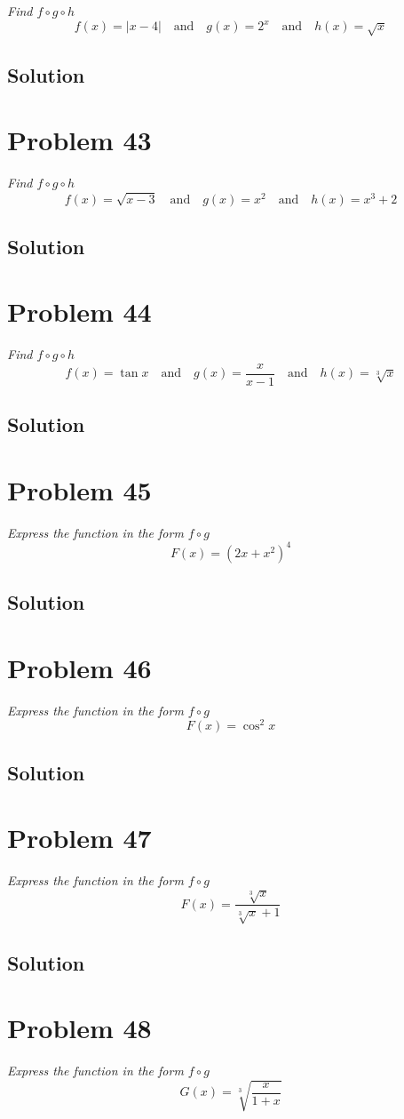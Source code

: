 \documentclass[11pt]{article}
\newcommand{\soln}{\subsection*}
\newcommand{\qn}{\textit}
\begin{document}
\qn{Find $f \circ g \circ h$ $$f(x)=|x-4| \quad \text{and} \quad g(x)=2^x \quad \text{and} \quad h(x)=\sqrt{x}$$}

\soln{Solution}

\section*{Problem 43}

\qn{Find $f \circ g \circ h$ $$f(x)=\sqrt{x-3} \quad \text{and} \quad g(x)=x^2 \quad \text{and} \quad h(x)=x^3+2$$}

\soln{Solution}

\section*{Problem 44}

\qn{Find $f \circ g \circ h$ $$f(x)=\tan{x} \quad \text{and} \quad g(x)=\frac{x}{x-1} \quad \text{and} \quad h(x)=\sqrt[3]{x}$$}

\soln{Solution}

\section*{Problem 45}

\qn{Express the function in the form $f \circ g$ $$F(x)=(2x+x^2)^4$$}

\soln{Solution}

\section*{Problem 46}

\qn{Express the function in the form $f \circ g$ $$F(x)=\cos^2{x}$$}

\soln{Solution}

\section*{Problem 47}

\qn{Express the function in the form $f \circ g$ $$F(x)=\frac{\sqrt[3]{x}}{\sqrt[3]{x}+1}$$}

\soln{Solution}

\section*{Problem 48}

\qn{Express the function in the form $f \circ g$ $$G(x)=\sqrt[3]{\frac{x}{1+x}}$$}
\end{document}
